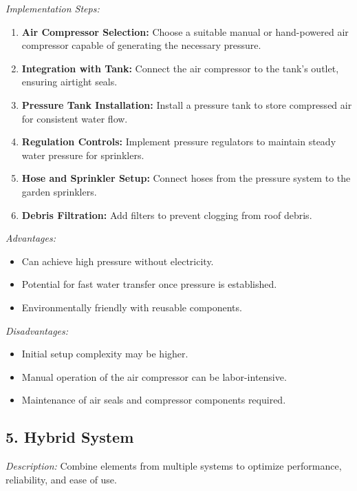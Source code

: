 \documentclass[12pt]{article}
\begin{document}
\noindent\textit{Implementation Steps:}
\begin{enumerate}[noitemsep, topsep=0pt]
\item \textbf{Air Compressor Selection:} Choose a suitable manual or hand-powered air compressor capable of generating the necessary pressure.
\item \textbf{Integration with Tank:} Connect the air compressor to the tank’s outlet, ensuring airtight seals.
\item \textbf{Pressure Tank Installation:} Install a pressure tank to store compressed air for consistent water flow.
\item \textbf{Regulation Controls:} Implement pressure regulators to maintain steady water pressure for sprinklers.
\item \textbf{Hose and Sprinkler Setup:} Connect hoses from the pressure system to the garden sprinklers.
\item \textbf{Debris Filtration:} Add filters to prevent clogging from roof debris.
\end{enumerate}

\noindent\textit{Advantages:}
\begin{itemize}[noitemsep, topsep=0pt]
\item Can achieve high pressure without electricity.
\item Potential for fast water transfer once pressure is established.
\item Environmentally friendly with reusable components.
\end{itemize}

\noindent\textit{Disadvantages:}
\begin{itemize}[noitemsep, topsep=0pt]
\item Initial setup complexity may be higher.
\item Manual operation of the air compressor can be labor-intensive.
\item Maintenance of air seals and compressor components required.
\end{itemize}
\newpage
\subsection*{5. Hybrid System}

\noindent\textit{Description:} Combine elements from multiple systems to optimize performance, reliability, and ease of use.
\end{document}
